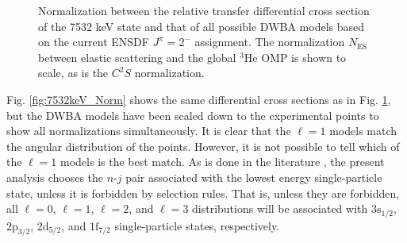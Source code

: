 \begin{figure}[t]
\centering
{}
\caption{\label{fig:7532keV_NoNorm}Normalization between the relative transfer differential cross section of the 7532 keV state and that of all possible DWBA models based on the current ENSDF $J^{\pi} = 2^{-}$ assignment. The normalization $N_{\mathrm{ES}}$ between elastic scattering and the global $^{3}$He OMP is shown to scale, as is the $C^{2}S$ normalization.}
\end{figure}

Fig. \ref{fig:7532keV_Norm} shows the same differential cross sections as in Fig. \ref{fig:7532keV_NoNorm}, but the DWBA models have been scaled down to the experimental points to show all normalizations simultaneously. It is clear that the $\ell=1$ models match the angular distribution of the points. However, it is not possible to tell which of the $\ell=1$ models is the best match. As is done in the literature \cite{Erskine1966,Seth1967,Forster1970,Cage1971,Fuchs1969}, the present analysis chooses the $n$-$j$ pair associated with the lowest energy single-particle state, unless it is forbidden by selection rules. That is, unless they are forbidden, all $\ell=0$, $\ell=1$, $\ell=2$, and $\ell=3$ distributions will be associated with $3\mathrm{s}_{1/2}$, $2\mathrm{p}_{3/2}$, $2\mathrm{d}_{5/2}$, and $1\mathrm{f}_{7/2}$ single-particle states, respectively.

